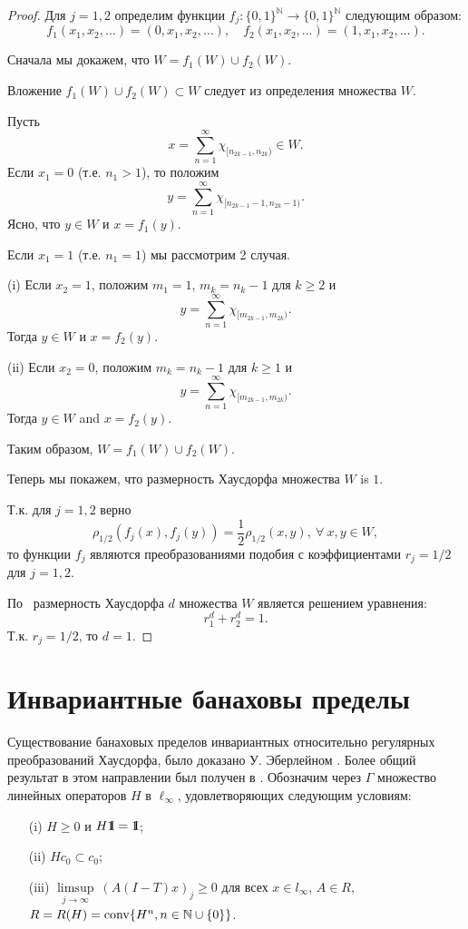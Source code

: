\documentclass[12pt]{article}
\newcommand{\emm}{\mathrm{1\hspace{-0.3em} I}}
\def\N{{\mathbb{N}}}
\begin{document}
\begin{proof}
Для $j=1,2$ определим функции $f_j : \{0,1\}^\N \to \{0,1\}^\N$ следующим образом:
$$f_1(x_1, x_2, \dots)=(0, x_1, x_2, \dots), \quad f_2(x_1, x_2, \dots)=(1, x_1, x_2, \dots).$$

Сначала мы докажем, что $W=f_1(W)\cup f_2(W).$

Вложение $f_1(W)\cup f_2(W) \subset W$ следует из определения множества $W$.

Пусть
$$x=\sum_{n=1}^\infty \chi_{[n_{2k-1},n_{2k})}\in W.$$
 Если $x_1=0$ (т.е. $n_1>1$), то положим
 $$y=\sum_{n=1}^\infty \chi_{[n_{2k-1}-1,n_{2k}-1)}.$$
 Ясно, что $y\in W$ и $x=f_1(y)$.

 Если $x_1=1$ (т.е. $n_1=1$) мы рассмотрим 2 случая.

 (i) Если $x_2=1$, положим $m_1=1$, $m_k=n_k-1$ для $k\ge2$ и
 $$y=\sum_{n=1}^\infty \chi_{[m_{2k-1},m_{2k})}.$$
 Тогда $y\in W$ и $x=f_2(y)$.

 (ii) Если $x_2=0$, положим $m_k=n_k-1$ для $k\ge1$ и
 $$y=\sum_{n=1}^\infty \chi_{[m_{2k-1},m_{2k})}.$$
 Тогда $y\in W$ and $x=f_2(y)$.

 Таким образом, $W=f_1(W)\cup f_2(W).$

 Теперь мы покажем, что размерность Хаусдорфа множества $W$ is $1$.

Т.к. для $j=1,2$ верно
 $$\rho_{1/2}(f_j(x),f_j(y))=\frac12\rho_{1/2}(x,y), \ \forall \ x, y \in W,$$
 то функции $f_j$ являются преобразованиями подобия с коэффициентами $r_j=1/2$ для $j=1,2$.


По~\cite[Теорема 9.3]{Edgar} размерность Хаусдорфа $d$ множества $W$ является решением уравнения:
$$ r_1^d+r_2^d=1.$$
Т.к. $r_j=1/2$, то
$d=1.$
\end{proof}

\section{Инвариантные банаховы пределы}\label{sec:inv}

Существование банаховых пределов инвариантных относительно регулярных преобразований Хаусдорфа, было доказано У. Эберлейном \cite{Eberlein}. Более общий результат в этом направлении был получен в \cite{SS_JFA}.
Обозначим через $\Gamma$ множество линейных операторов $H$ в $\ell_\infty$, удовлетворяющих следующим условиям:
\begin{enumerate}
\item[(i)]
$H\geq0$ и $H\emm=\emm$;

\item[(ii)]
$Hc_0\subset c_0$;

\item[(iii)]
$\limsup\limits_{j\to\infty} \ (A(I-T)x)_j\geq0$ для всех $x\in
l_\infty$, $A\in
R$, $R=R(H)={\rm conv} \{H^n,n\in\mathbb N\cup\{0\}\}$.
\end{enumerate}
\end{document}
